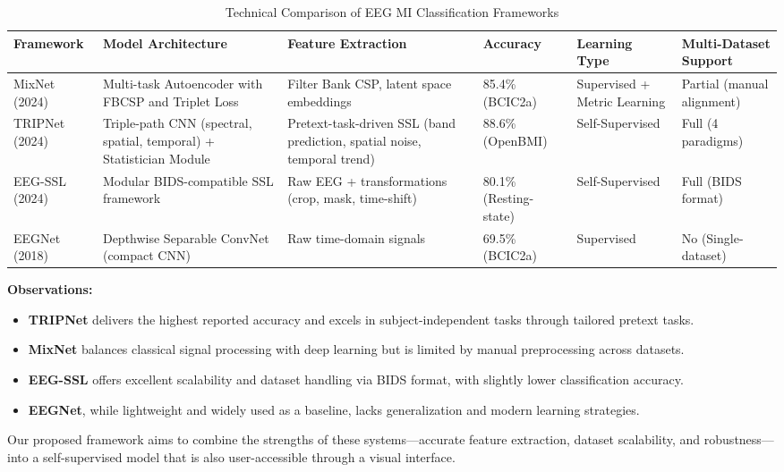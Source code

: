\begin{table}[H]
    \centering
    \caption{Technical Comparison of EEG MI Classification Frameworks}
    \label{tab:competitor-comparison}
    \small
    \begin{tabularx}{\textwidth}{|p{2cm}|p{2.2cm}|p{2.2cm}|p{1.7cm}|p{2cm}|p{2cm}|}
        \hline
        \textbf{Framework} & \textbf{Model Architecture} & \textbf{Feature Extraction} & \textbf{Accuracy} & \textbf{Learning Type} & \textbf{Multi-Dataset Support} \\
        \hline
        MixNet (2024) & Multi-task Autoencoder with FBCSP and Triplet Loss & Filter Bank CSP, latent space embeddings & 85.4\% (BCIC2a) & Supervised + Metric Learning & Partial (manual alignment) \\
        \hline
        TRIPNet (2024) & Triple-path CNN (spectral, spatial, temporal) + Statistician Module & Pretext-task-driven SSL (band prediction, spatial noise, temporal trend) & 88.6\% (OpenBMI) & Self-Supervised & Full (4 paradigms) \\
        \hline
        EEG-SSL (2024) & Modular BIDS-compatible SSL framework & Raw EEG + transformations (crop, mask, time-shift) & 80.1\% (Resting-state) & Self-Supervised & Full (BIDS format) \\
        \hline
        EEGNet (2018) & Depthwise Separable ConvNet (compact CNN) & Raw time-domain signals & 69.5\% (BCIC2a) & Supervised & No (Single-dataset) \\
        \hline
    \end{tabularx}
\end{table}
\noindent
\textbf{Observations:}
\begin{itemize}
    \item \textbf{TRIPNet} delivers the highest reported accuracy and excels in subject-independent tasks through tailored pretext tasks.
    \item \textbf{MixNet} balances classical signal processing with deep learning but is limited by manual preprocessing across datasets.
    \item \textbf{EEG-SSL} offers excellent scalability and dataset handling via BIDS format, with slightly lower classification accuracy.
    \item \textbf{EEGNet}, while lightweight and widely used as a baseline, lacks generalization and modern learning strategies.
\end{itemize}

\noindent
Our proposed framework aims to combine the strengths of these systems—accurate feature extraction, dataset scalability, and robustness—into a self-supervised model that is also user-accessible through a visual interface.

